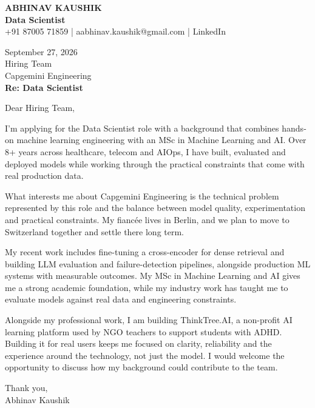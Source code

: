 \documentclass[10pt,a4paper]{article}
\begin{document}
\begin{center}
{\Large\bfseries ABHINAV KAUSHIK}\\[2pt]
{\bfseries Data Scientist}\\[2pt]
+91 87005 71859 \quad | \quad aabhinav.kaushik@gmail.com \quad | \quad LinkedIn
\end{center}
\vspace{8pt}
September 27, 2026\\[6pt]
Hiring Team\\
Capgemini Engineering\\[4pt]
\textbf{Re: Data Scientist}

Dear Hiring Team,

I’m applying for the Data Scientist role with a background that combines hands-on machine learning engineering with an MSc in Machine Learning and AI. Over 8+ years across healthcare, telecom and AIOps, I have built, evaluated and deployed models while working through the practical constraints that come with real production data.

What interests me about Capgemini Engineering is the technical problem represented by this role and the balance between model quality, experimentation and practical constraints. My fiancée lives in Berlin, and we plan to move to Switzerland together and settle there long term.

My recent work includes fine-tuning a cross-encoder for dense retrieval and building LLM evaluation and failure-detection pipelines, alongside production ML systems with measurable outcomes. My MSc in Machine Learning and AI gives me a strong academic foundation, while my industry work has taught me to evaluate models against real data and engineering constraints.

Alongside my professional work, I am building ThinkTree.AI, a non-profit AI learning platform used by NGO teachers to support students with ADHD. Building it for real users keeps me focused on clarity, reliability and the experience around the technology, not just the model. I would welcome the opportunity to discuss how my background could contribute to the team.

Thank you,\\
Abhinav Kaushik
\end{document}
